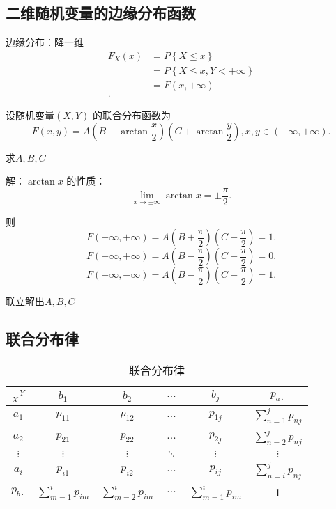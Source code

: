 \subsection{二维随机变量的边缘分布函数}%
\label{sub:二维随机变量的边缘分布函数}
边缘分布：降一维
\begin{align*}
    F_{X}\left( x \right) &= P\left\{ X\le x \right\}  \\
    &= P\left\{ X\le x,Y<+\infty \right\}  \\
    &= F\left( x,+\infty \right)  \\
.\end{align*}
\begin{eg}
    设随机变量$\left( X,Y \right) $ 的联合分布函数为\[
        F\left( x,y \right) =A\left( B+\arctan \frac{x}{2} \right) \left( C+\arctan \frac{y}{2} \right) , x,y\in \left( -\infty,+\infty \right) 
    .\] 

    求$A,B,C$ 

    解：$\arctan x$ 的性质：\[
        \lim_{x \to \pm\infty} \arctan x=\pm\frac{\pi}{2}
    .\] 

    则\[
        F\left( +\infty,+\infty \right) =A\left( B+\frac{\pi}{2} \right) \left( C+\frac{\pi}{2} \right)=1 
    .\] 
    \[
        F\left( -\infty,+\infty \right) =A\left( B-\frac{\pi}{2} \right) \left( C+\frac{\pi}{2} \right) =0
    .\] 
    \[
        F\left( -\infty,-\infty \right) =A\left( B-\frac{\pi}{2} \right) \left( C-\frac{\pi}{2} \right) =1
    .\] 

    联立解出$A,B,C$
\end{eg}
\subsection{联合分布律}%
\label{sub:联合分布律}
\begin{table}[htpb]
    \centering
    \caption{联合分布律}
    \label{tab:联合分布律}
    \begin{tabular}{c|cccc|c}
    \toprule
    $_X \hspace{1pt} ^Y$ & $b_1$ & $b_2$ & $\ldots$ & $b_{j}$ & $p_{a\cdot }$ \\
    \hline
    $a_1$ & $p_{11}$ & $p_{12}$ & $\ldots$ & $p_{1j}$ & ${\sum_{n=1}^{j} p_{nj}}$\\
    $a_2$ & $p_{21}$ & $p_{22}$ & $\ldots$ & $p_{2j}$ & ${\sum_{n=2}^{j} p_{nj}}$ \\
    $\vdots$ & $\vdots$ & $\vdots$ & $\ddots$ & $\vdots$ & $\vdots$\\
    $a_{i}$ & $p_{i1}$ & $p_{i2}$ & $\ldots$ & $p_{ij}$ & ${\sum_{n=i}^{j} p_{nj}}$\\
    \hline
    $p_{b\cdot }$ & ${\sum_{m=1}^{i} p_{im}}$ & ${\sum_{m=2}^{i} p_{im}}$ & $\ldots$ & ${\sum_{m=1}^{i} p_{im}}$ & 1\\
    \bottomrule
    \end{tabular}
\end{table}


